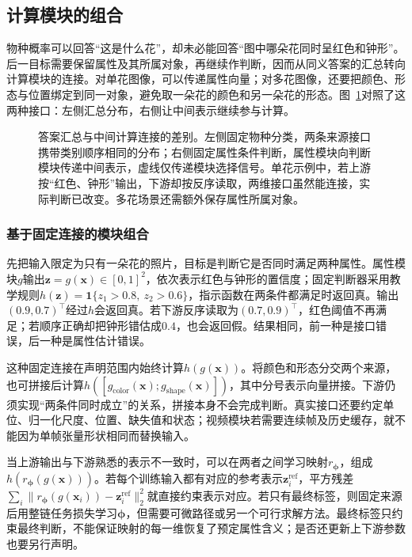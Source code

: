 \subsection{计算模块的组合}
\label{sec:ket-integration-modules}

物种概率可以回答“这是什么花”，却未必能回答“图中哪朵花同时呈红色和钟形”。后一目标需要保留属性及其所属对象，再继续作判断，因而从同义答案的汇总转向计算模块的连接。对单花图像，可以传递属性向量；对多花图像，还要把颜色、形态与位置绑定到同一对象，避免取一朵花的颜色和另一朵花的形态。图~\ref{fig:ket-integration-interfaces}对照了这两种接口：左侧汇总分布，右侧让中间表示继续参与计算。

\begin{figure}[htbp]
  \centering
  
  \caption{答案汇总与中间计算连接的差别。左侧固定物种分类，两条来源接口携带类别顺序相同的分布；右侧固定属性条件判断，属性模块向判断模块传递中间表示，虚线仅传递模块选择信号。单花示例中，若上游按“红色、钟形”输出，下游却按反序读取，两维接口虽然能连接，实际判断已改变。多花场景还需额外保存属性所属对象。}
  \label{fig:ket-integration-interfaces}
\end{figure}

\subsubsection{基于固定连接的模块组合}
\label{sec:ket-integration-fixed-modules}

先把输入限定为只有一朵花的照片，目标是判断它是否同时满足两种属性。属性模块$g$输出$\bm{z}=g(\bm{x})\in[0,1]^2$，依次表示红色与钟形的置信度；固定判断器采用教学规则$h(\bm{z})=\mathbf{1}\{z_1>0.8,\ z_2>0.6\}$，指示函数在两条件都满足时返回真。输出$(0.9,0.7)^\top$经过$h$会返回真。若下游反序读取为$(0.7,0.9)^\top$，红色阈值不再满足；若顺序正确却把钟形错估成$0.4$，也会返回假。结果相同，前一种是接口错误，后一种是属性估计错误。

这种固定连接在声明范围内始终计算$h(g(\bm{x}))$。将颜色和形态分交两个来源，也可拼接后计算$h([g_{\mathrm{color}}(\bm{x});g_{\mathrm{shape}}(\bm{x})])$，其中分号表示向量拼接。下游仍须实现“两条件同时成立”的关系，拼接本身不会完成判断。真实接口还要约定单位、归一化尺度、位置、缺失值和状态；视频模块若需要连续帧及历史缓存，就不能因为单帧张量形状相同而替换输入。

当上游输出与下游熟悉的表示不一致时，可以在两者之间学习映射$r_{\bm{\phi}}$，组成$h(r_{\bm{\phi}}(g(\bm{x})))$。若每个训练输入都有对应的参考表示$\bm{z}^{\mathrm{ref}}_i$，平方残差$\sum_i\lVert r_{\bm{\phi}}(g(\bm{x}_i))-\bm{z}^{\mathrm{ref}}_i\rVert_2^2$就直接约束表示对应。若只有最终标签，则固定来源后用整链任务损失学习$\bm{\phi}$，但需要可微路径或另一个可行求解方法。最终标签只约束最终判断，不能保证映射的每一维恢复了预定属性含义；是否还更新上下游参数也要另行声明。

